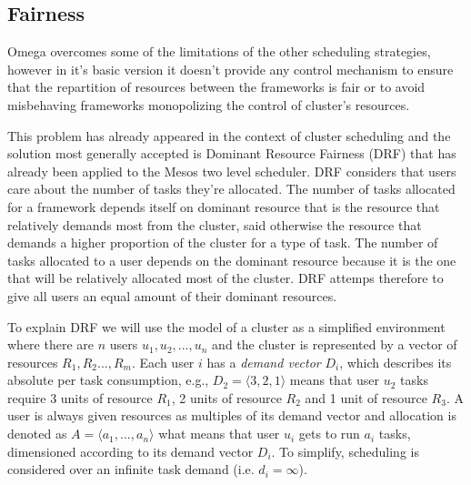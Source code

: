 \documentclass{report}                     %
\begin{document}

\subsection{Fairness}

Omega overcomes some of the limitations of the other
scheduling strategies, however in it's basic version it doesn't
provide any control mechanism to ensure that the repartition of
resources between the frameworks is fair or to avoid misbehaving
frameworks monopolizing the control of cluster's resources.

This problem has already appeared in the context of cluster scheduling
and the solution most generally accepted is Dominant Resource Fairness
(DRF) that has already been applied to the Mesos two level
scheduler. DRF considers that users care about the number of tasks
they're allocated. The number of tasks allocated for a framework
depends itself on dominant resource that is the resource that
relatively demands most from the cluster, said otherwise the resource
that demands a higher proportion of the cluster for a type of
task. The number of tasks allocated to a user depends on the dominant
resource because it is the one that will be relatively allocated most
of the cluster. DRF attemps therefore to give all users an equal
amount of their dominant resources.

To explain DRF we will use the model of a cluster as a simplified
environment where there are $n$ users $u_{1},u_{2},...,u_{n}$ and the
cluster is represented by a vector of resources
$R_{1},R_{2}...,R_{m}$. Each user $i$ has a \emph{demand vector}
$D_{i}$, which describes its absolute per task consumption, e.g.,
$D_{2} = \langle 3, 2, 1 \rangle$ means that user $u_{2}$ tasks
require 3 units of resource $R_{1}$, 2 units of resource $R_{2}$ and 1
unit of resource $R_{3}$. A user is always given resources as
multiples of its demand vector and allocation is denoted as $A =
\langle a_{1},...,a_{n} \rangle$ what means that user $u_{i}$ gets to
run $a_{i}$ tasks, dimensioned according to its demand vector
$D_{i}$. To simplify, scheduling is considered over an infinite task
demand (i.e. $d_{i} = \infty$).
\end{document}

